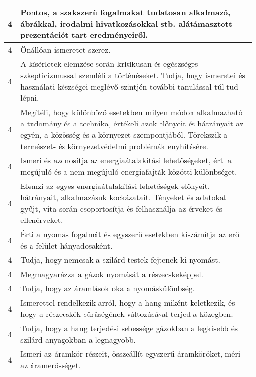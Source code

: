\begin{longtable}{c | p{12cm} }
                                
                                          4 &  Pontos, a szakszerű fogalmakat tudatosan alkalmazó, ábrákkal, irodalmi hivatkozásokkal stb. alátámasztott prezentációt tart eredményeiről. \\ \hline
                                          4 &  Önállóan ismeretet szerez. \\ \hline
                                          4 &  A kísérletek elemzése során kritikusan és egészséges szkepticizmussal szemléli a történéseket. Tudja, hogy ismeretei és használati készségei meglévő szintjén további tanulással túl tud lépni. \\ \hline
                                          4 &  Megítéli, hogy különböző esetekben milyen módon alkalmazható a tudomány és a technika, értékeli azok előnyeit és hátrányait az egyén, a közösség és a környezet szempontjából. Törekszik a természet- és környezetvédelmi problémák enyhítésére. \\ \hline
                                          4 &  Ismeri és azonosítja az energiaátalakítási lehetőségeket, érti a megújuló és a nem megújuló energiafajták közötti különbséget. \\ \hline
                                          4 &  Elemzi az egyes energiaátalakítási lehetőségek előnyeit, hátrányait, alkalmazásuk kockázatait. Tényeket és adatokat gyűjt, vita során csoportosítja és felhasználja az érveket és ellenérveket. \\ \hline
                                          4 &  Érti a nyomás fogalmát és egyszerű esetekben kiszámítja az erő és a felület hányadosaként. \\ \hline
                                          4 &  Tudja, hogy nemcsak a szilárd testek fejtenek ki nyomást. \\ \hline
                                          4 &  Megmagyarázza a gázok nyomását a részecskeképpel. \\ \hline
                                          4 &  Tudja, hogy az áramlások oka a nyomáskülönbség. \\ \hline
                                          4 &  Ismerettel rendelkezik arról, hogy a hang miként keletkezik, és hogy a részecskék sűrűségének változásával terjed a közegben. \\ \hline
                                          4 &  Tudja, hogy a hang terjedési sebessége gázokban a legkisebb és szilárd anyagokban a legnagyobb. \\ \hline
                                          4 &  Ismeri az áramkör részeit, összeállít egyszerű áramköröket, méri az áramerősséget. \\ \hline

\end{longtable}
